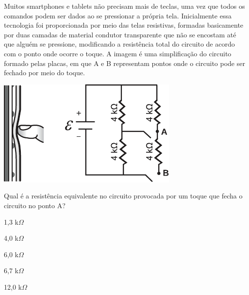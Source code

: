 \questao \label{cn-last}
Muitos smartphones e tablets não precisam mais de teclas, uma vez que todos os comandos podem ser dados ao se pressionar a própria tela. Inicialmente essa tecnologia foi proporcionada por meio das telas resistivas, formadas basicamente por duas camadas de material condutor transparente que não se encostam até que alguém se pressione, modificando a resistência total do circuito de acordo com o ponto onde ocorre o toque. A imagem é uma simplificação do circuito formado pelas placas, em que A e B representam pontos onde o circuito pode ser fechado por meio do toque.
\begin{center}
\includegraphics[width=\columnwidth]{subareas/ciencias_natureza/fisica-7.pdf}
\end{center}
Qual é a resistência equivalente no circuito provocada por um toque que fecha o circuito no ponto A?
\begin{alternativas}
\item 1,3 k$\Omega$
\item 4,0 k$\Omega$
\item 6,0 k$\Omega$
\item 6,7 k$\Omega$
\item 12,0 k$\Omega$
\end{alternativas}